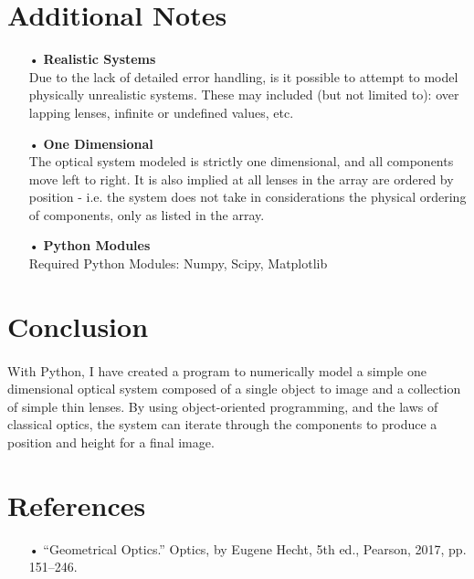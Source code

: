 \documentclass[12pt,letterpaper]{article}
\begin{document}
\section{Additional Notes}
\begin{itemize}
\item[•]\textbf{Realistic Systems}\\
Due to the lack of detailed error handling, is it possible to attempt to model physically unrealistic systems. These may included (but not limited to): over lapping lenses, infinite or undefined values, etc.
\item[•]\textbf{One Dimensional}\\
The optical system modeled is strictly one dimensional, and all components move left to right. It is also implied at all lenses in the array are ordered by position - i.e. the system does not take in considerations the physical ordering of components, only as listed in the array.
\item[•]\textbf{Python Modules}\\
Required Python Modules: Numpy, Scipy, Matplotlib
\end{itemize}


\section{Conclusion}
\paragraph*{}With Python, I have created a program to numerically model a simple one dimensional optical system composed of a single object to image and a collection of simple thin lenses. By using object-oriented programming, and the laws of classical optics, the system can iterate through the components to produce a position and height for a final image.


\section{References}
\begin{itemize}
\item[•]“Geometrical Optics.” Optics, by Eugene Hecht, 5th ed., Pearson, 2017, pp. 151–246.
\end{itemize}
\end{document}
